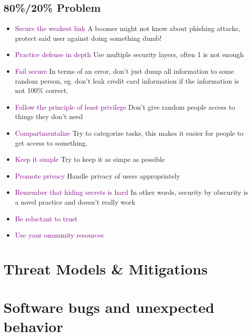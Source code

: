 \documentclass[main.tex,fontsize=8pt,paper=a4,paper=portrait,DIV=calc,]{scrartcl}
\begin{document}
\subsection{80\%/20\% Problem}
\begin{itemize}
\item \textcolor{purple}{Secure the weakest link}\newline
  A boomer might not know about phishing attacks, protect said user against doing something dumb!
\item \textcolor{purple}{Practice defense in depth}\newline
  Use multiple security layers, often 1 is not enough
\item \textcolor{purple}{Fail secure}\newline
  In terms of an error, don't just dump all information to some random person, eg. don't leak credit card information if the information is not 100\% correct.
\item \textcolor{purple}{Follow the principle of least privilege}\newline
  Don't give random people access to things they don't need
\item \textcolor{purple}{Compartmentalize}\newline
  Try to categorize tasks, this makes it easier for people to get access to something.
\item \textcolor{purple}{Keep it simple}\newline
  Try to keep it as simpe as possible
\item \textcolor{purple}{Promote privacy}\newline
  Handle privacy of users appropriately
\item \textcolor{purple}{Remember that hiding secrets is hard}
  In other words, security by obscurity is a novel practice and doesn't really work
\item \textcolor{purple}{Be reluctant to trust}
\item \textcolor{purple}{Use your ommunity resources}
\end{itemize}

\section{Threat Models \& Mitigations}

\section{Software bugs and unexpected behavior}
\end{document}
